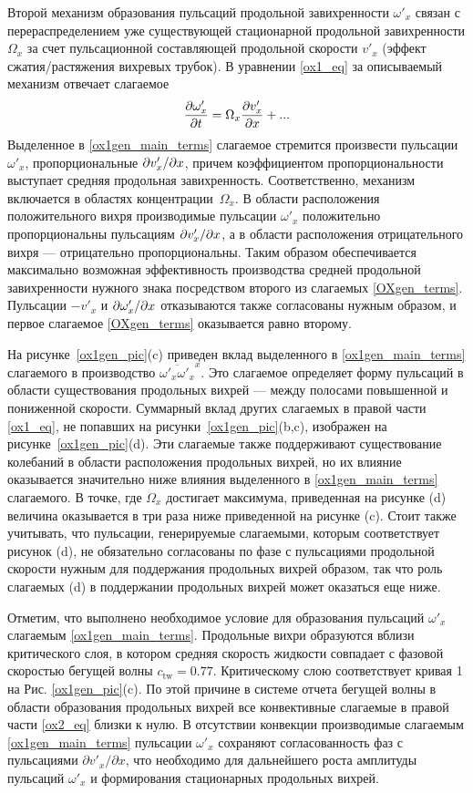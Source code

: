 Второй механизм образования пульсаций продольной завихренности $\omega'_x$ связан с перераспределением уже существующей стационарной продольной завихренности $\Omega_x$ за счет пульсационной составляющей продольной скорости $v'_x$ (эффект сжатия/растяжения вихревых трубок). В уравнении \eqref{ox1_eq} за описываемый механизм отвечает слагаемое
\begin{equation}\label{ox1gen_main_terms}
\frac{\partial \omega'_x}{\partial t} = \Omega_x \frac {\partial v'_x}{\partial x} + ...
\end{equation}
Выделенное в \eqref{ox1gen_main_terms} слагаемое стремится произвести пульсации $\omega'_x$, пропорциональные $\partial v'_x / \partial x$, причем коэффициентом пропорциональности выступает средняя продольная завихренность. Соответственно,  механизм включается в областях концентрации~$\Omega_x$. В области расположения положительного вихря производимые пульсации $\omega'_x$ положительно пропорциональны пульсациям $\partial v'_x / \partial x$, а в области расположения отрицательного вихря --- отрицательно пропорциональны. Таким образом обеспечивается максимально возможная эффективность производства средней продольной завихренности нужного знака посредством второго из слагаемых \eqref{OXgen_terms}. Пульсации $-v'_x$ и $\partial \omega'_x / \partial x$ отказываются также согласованы нужным образом, и первое слагаемое \eqref{OXgen_terms} оказывается равно второму.

На рисунке~\ref{ox1gen_pic}(c) приведен вклад выделенного в \eqref{ox1gen_main_terms} слагаемого в производство $\overline{\omega'_x \omega'_x}^x$. Это слагаемое определяет форму пульсаций в области существования продольных вихрей --- между полосами повышенной и пониженной скорости. Суммарный вклад других слагаемых в правой части \eqref{ox1_eq}, не попавших на рисунки~\ref{ox1gen_pic}(b,c), изображен на рисунке~\ref{ox1gen_pic}(d). Эти слагаемые также поддерживают существование колебаний в области расположения продольных вихрей, но их влияние оказывается значительно ниже влияния выделенного в \eqref{ox1gen_main_terms} слагаемого. В точке, где $\Omega_x$ достигает максимума, приведенная на рисунке (d) величина оказывается в три раза ниже приведенной на рисунке (c). Стоит также учитывать, что пульсации, генерируемые слагаемыми, которым соответствует рисунок (d), не обязательно согласованы по фазе с пульсациями продольной скорости нужным для поддержания продольных вихрей образом, так что роль слагаемых (d) в поддержании продольных вихрей может оказаться еще ниже. 

Отметим, что выполнено необходимое условие для образования пульсаций $\omega'_x$ слагаемым \eqref{ox1gen_main_terms}. Продольные вихри образуются вблизи критического слоя, в котором средняя скорость жидкости совпадает с фазовой скоростью бегущей волны $c_\mathrm{tw} = 0.77$. Критическому слою соответствует кривая 1 на Рис. \ref{ox1gen_pic}(c). По этой причине в системе отчета бегущей волны в области образования продольных вихрей все конвективные слагаемые в правой части \eqref{ox2_eq} близки к нулю. В отсутствии конвекции производимые слагаемым \eqref{ox1gen_main_terms} пульсации $\omega'_x$ сохраняют согласованность фаз с пульсациями $\partial v'_x / \partial x$, что необходимо для дальнейшего роста амплитуды пульсаций $\omega'_x$ и формирования стационарных продольных вихрей. 

